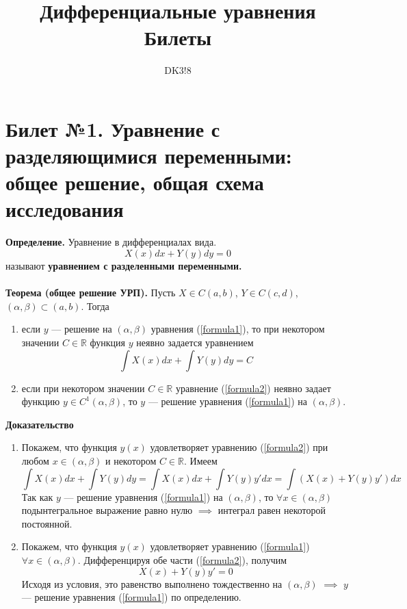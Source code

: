 \documentclass{article}
\title{\textbf{Дифференциальные уравнения\\ Билеты}}
\author{DK3!8}
\makeatletter
\renewcommand\tableofcontents{%
  \null\hfill\textbf{\Large\contentsname}\hfill\null\par
  \@mkboth{\MakeUppercase\contentsname}{\MakeUppercase\contentsname}%
  \@starttoc{toc}%
}
\makeatother
\begin{document}
  \maketitle

\tableofcontents
\newpage

\section{Билет №1. Уравнение с разделяющимися переменными: общее решение, общая схема
исследования}
\textbf{Определение.} Уравнение в дифференциалах вида.
\begin{equation}
  X(x)dx + Y(y)dy = 0 \label{formula1}
\end{equation}
называют \textbf{уравнением с разделенными переменными.}\\
\\
\textbf{Теорема (общее решение УРП).} Пусть $X \in C(a,b)$, $Y \in C(c,d)$, $(\alpha, \beta) \subset (a,b)$. Тогда
\begin{enumerate}
    \item если $y$ --- решение на $(\alpha, \beta)$ уравнения (\ref{formula1}), то при некотором значении $C \in \mathbb{R}$ функция $y$ неявно задается уравнением
    \begin{equation}
        \int X(x)dx + \int Y(y)dy = C \label{formula2}
    \end{equation}
    \item если при некотором значении $C \in \mathbb{R}$ уравнение (\ref{formula2}) неявно задает функцию $y \in C^1(\alpha, \beta)$, то $y$ --- решение уравнения (\ref{formula1}) на $(\alpha, \beta)$. 
\end{enumerate}
\textbf{Доказательство}
\begin{enumerate}
    \item Покажем, что функция $y(x)$ удовлетворяет уравнению (\ref{formula2}) при любом $x \in (\alpha, \beta)$ и некотором $C \in \mathbb{R}$. Имеем
    \begin{equation*}
        \int X(x)dx + \int Y(y)dy = \int X(x)dx + \int Y(y)y'dx = \int (X(x) + Y(y)y')dx
    \end{equation*}
    Так как $y$ --- решение уравнения (\ref{formula1}) на $(\alpha, \beta)$, то $\forall x \in (\alpha, \beta)$ подынтегральное выражение равно нулю $\implies$ интеграл равен некоторой постоянной.
    \item Покажем, что функция $y(x)$ удовлетворяет уравнению (\ref{formula1}) $\forall x \in (\alpha, \beta)$. Дифференцируя обе части (\ref{formula2}), получим
    \begin{equation*}
        X(x) + Y(y)y' = 0
    \end{equation*}
    Исходя из условия, это равенство выполнено тождественно на $(\alpha, \beta)$ $\implies$ $y$ --- решение уравнения (\ref{formula1}) по определению.
\end{enumerate}
\end{document}
